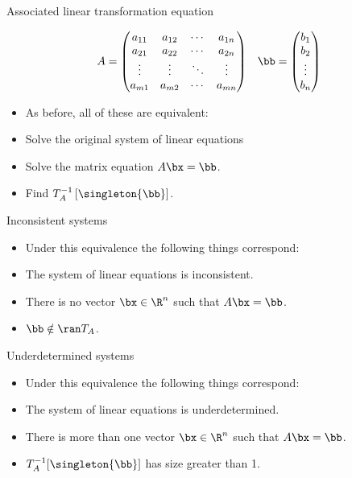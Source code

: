 \documentclass[handout]{beamer}
\begin{document}
\begin{frame}{Associated linear transformation equation}


$$
\begin{matrix}
A =
\begin{pmatrix}
a_{11} & a_{12} & \cdots & a_{1n} \\
a_{21} & a_{22} & \cdots & a_{2n} \\
\vdots & \vdots & \ddots & \vdots \\
a_{m1} & a_{m2} & \cdots & a_{mn}
\end{pmatrix}
&
\bb =
\begin{pmatrix}
b_1 \\ b_2 \\ \vdots \\ b_n
\end{pmatrix}
\end{matrix}
$$

\begin{itemize}
\item As before, all of these are equivalent:
\item Solve the original system of linear equations
\item Solve the matrix equation $A\bx=\bb$.
\item Find $T_A^{-1} \left[ \singleton{\bb}\right]$.
\end{itemize}


\end{frame}



\begin{frame}{Inconsistent systems}

\begin{itemize}
\item Under this equivalence the following things correspond:
\item The system of linear equations is inconsistent.
\item There is no vector $\bx \in \R^n$ such that $A \bx = \bb$.
\item $\bb \notin \ran T_A$.
\end{itemize}

\end{frame}


\begin{frame}{Underdetermined systems}

\begin{itemize}
\item Under this equivalence the following things correspond:
\item The system of linear equations is underdetermined.
\item There is more than one vector $\bx \in \R^n$ such that $A \bx = \bb$.
\item $T_A^{-1}[\singleton{\bb}]$ has size greater than 1.
\end{itemize}

\end{frame}
\end{document}
